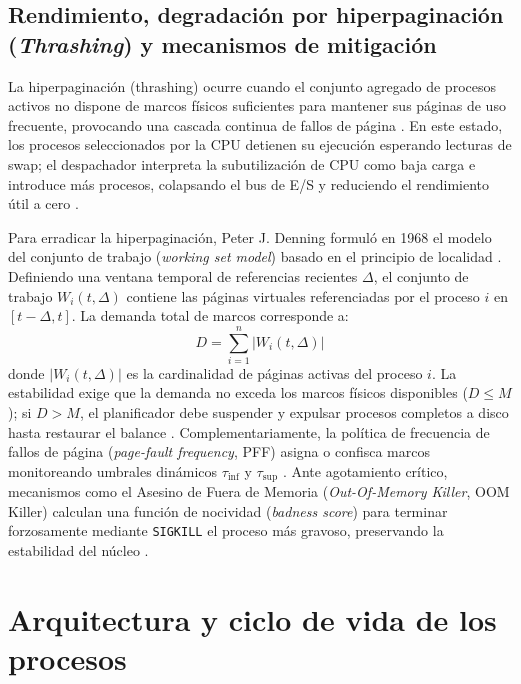 \documentclass[12pt]{article}
\begin{document}
\subsection{Rendimiento, degradación por hiperpaginación (\textit{Thrashing}) y mecanismos de mitigación}

La hiperpaginación (thrashing) ocurre cuando el conjunto agregado de procesos activos no dispone de marcos físicos suficientes para mantener sus páginas de uso frecuente, provocando una cascada continua de fallos de página \parencite[\S 9.6.1, p.\ 305]{silberschatz2006fundamentos}. En este estado, los procesos seleccionados por la CPU detienen su ejecución esperando lecturas de swap; el despachador interpreta la subutilización de CPU como baja carga e introduce más procesos, colapsando el bus de E/S y reduciendo el rendimiento útil a cero \parencite[\S 8.2, p.\ 388]{stallings2018operating}.

Para erradicar la hiperpaginación, Peter J. Denning formuló en 1968 el modelo del conjunto de trabajo (\textit{working set model}) basado en el principio de localidad \parencite[\S 9.6.2, p.\ 307]{silberschatz2006fundamentos}. Definiendo una ventana temporal de referencias recientes $\Delta$, el conjunto de trabajo $W_i(t, \Delta)$ contiene las páginas virtuales referenciadas por el proceso $i$ en $[t - \Delta, t]$. La demanda total de marcos corresponde a:
\begin{equation}
    D = \sum_{i=1}^{n} |W_i(t, \Delta)|
\end{equation}
donde $|W_i(t, \Delta)|$ es la cardinalidad de páginas activas del proceso $i$. La estabilidad exige que la demanda no exceda los marcos físicos disponibles ($D \le M$); si $D > M$, el planificador debe suspender y expulsar procesos completos a disco hasta restaurar el balance \parencite[\S 8.2, p.\ 401]{stallings2018operating}. Complementariamente, la política de frecuencia de fallos de página (\textit{page-fault frequency}, PFF) asigna o confisca marcos monitoreando umbrales dinámicos $\tau_{\text{inf}}$ y $\tau_{\text{sup}}$ \parencite[\S 9.6.3, p.\ 308]{silberschatz2006fundamentos}. Ante agotamiento crítico, mecanismos como el Asesino de Fuera de Memoria (\textit{Out-Of-Memory Killer}, OOM Killer) calculan una función de nocividad (\textit{badness score}) para terminar forzosamente mediante \texttt{SIGKILL} el proceso más gravoso, preservando la estabilidad del núcleo \parencite[\S 11.6, p.\ 494]{deitel2004operating}.

\clearpage

\section{Arquitectura y ciclo de vida de los procesos}
\end{document}
